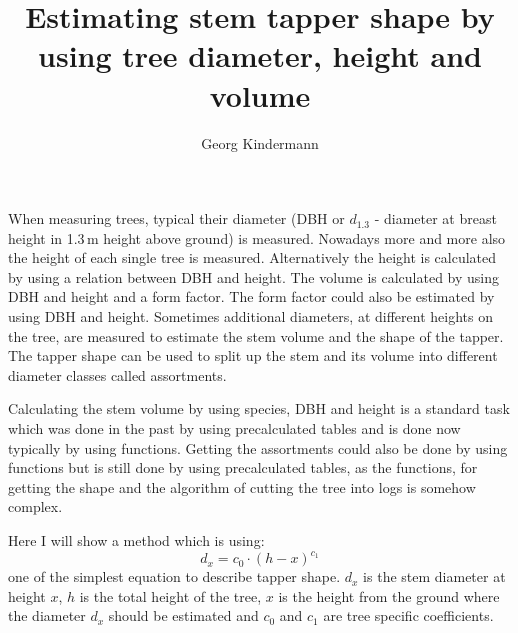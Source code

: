 \documentclass[twocolumn,10pt]{article}
\title{Estimating stem tapper shape by using tree diameter, height and volume}
\author{Georg Kindermann}
\begin{document}



When measuring trees, typical their diameter (DBH or $d_{1.3}$ - diameter at
breast height in 1.3\,m height above ground) is measured. Nowadays more and more
also the height of each single tree is measured. Alternatively the height is
calculated by using a relation between DBH and height. The volume is calculated
by using DBH and height and a form factor. The form factor could also be
estimated by using DBH and height. Sometimes additional diameters, at different
heights on the tree, are measured to estimate the stem volume and the shape of
the tapper. The tapper shape can be used to split up the stem and its volume
into different diameter classes called assortments.

Calculating the stem volume by using species, DBH and height is a standard task
which was done in the past by using precalculated tables and is done now
typically by using functions. Getting the assortments could also be done by
using functions but is still done by using precalculated tables, as the
functions, for getting the shape and the algorithm of cutting the tree into logs
is somehow complex.

Here I will show a method which is using:
$$d_x = c_0 \cdot (h - x)^{c_1}$$
one of the simplest equation to describe
tapper shape. $d_x$ is the stem diameter at height $x$, $h$ is the total height
of the tree, $x$ is the height from the ground where the diameter $d_x$ should
be estimated and $c_0$ and $c_1$ are tree specific coefficients.
\end{document}
